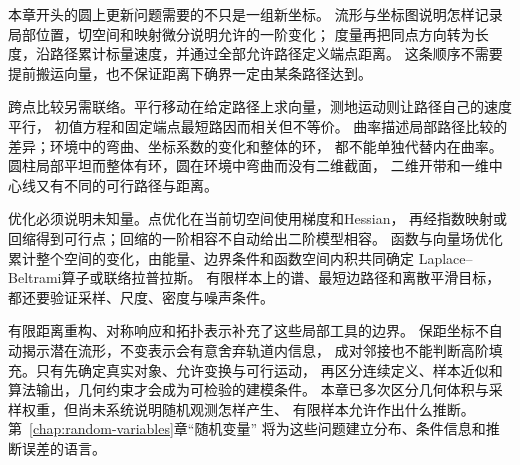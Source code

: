 本章开头的圆上更新问题需要的不只是一组新坐标。
流形与坐标图说明怎样记录局部位置，切空间和映射微分说明允许的一阶变化；
度量再把同点方向转为长度，沿路径累计标量速度，并通过全部允许路径定义端点距离。
这条顺序不需要提前搬运向量，也不保证距离下确界一定由某条路径达到。

跨点比较另需联络。平行移动在给定路径上求向量，测地运动则让路径自己的速度平行，
初值方程和固定端点最短路因而相关但不等价。
曲率描述局部路径比较的差异；环境中的弯曲、坐标系数的变化和整体的环，
都不能单独代替内在曲率。圆柱局部平坦而整体有环，圆在环境中弯曲而没有二维截面，
二维开带和一维中心线又有不同的可行路径与距离。

优化必须说明未知量。点优化在当前切空间使用梯度和Hessian，
再经指数映射或回缩得到可行点；回缩的一阶相容不自动给出二阶模型相容。
函数与向量场优化累计整个空间的变化，由能量、边界条件和函数空间内积共同确定
Laplace--Beltrami算子或联络拉普拉斯。
有限样本上的谱、最短边路径和离散平滑目标，都还要验证采样、尺度、密度与噪声条件。

有限距离重构、对称响应和拓扑表示补充了这些局部工具的边界。
保距坐标不自动揭示潜在流形，不变表示会有意舍弃轨道内信息，
成对邻接也不能判断高阶填充。只有先确定真实对象、允许变换与可行运动，
再区分连续定义、样本近似和算法输出，几何约束才会成为可检验的建模条件。
本章已多次区分几何体积与采样权重，但尚未系统说明随机观测怎样产生、
有限样本允许作出什么推断。第~\ref{chap:random-variables}章“随机变量”
将为这些问题建立分布、条件信息和推断误差的语言。
